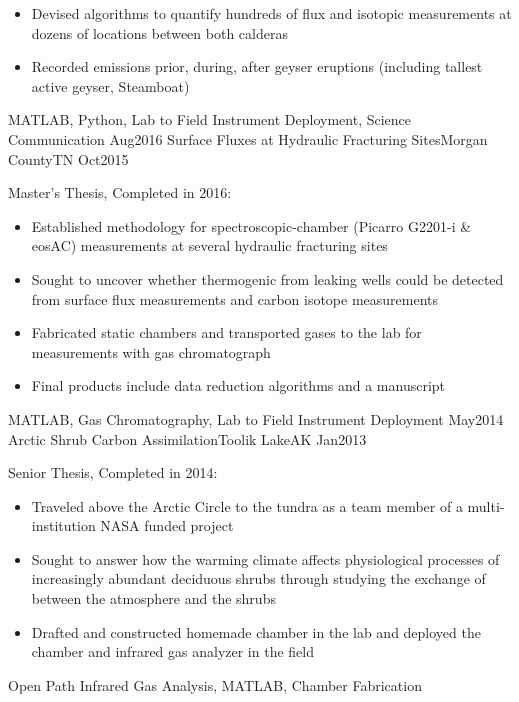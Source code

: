 \begin{experiences}
{\begin{itemize}
                        \item Devised algorithms to quantify hundreds of flux and isotopic measurements at dozens of locations between both calderas
                        \item Recorded emissions prior, during, after geyser eruptions (including tallest active geyser, Steamboat)
                      \end{itemize}
                    }
                    {MATLAB, Python, Lab to Field Instrument Deployment, Science Communication}
  \emptySeparator
  \experience
  {Aug2016}       {Surface Fluxes at Hydraulic Fracturing Sites}{Morgan County}{TN}
  {Oct2015}       {
                   Master's Thesis, Completed in 2016:
                     \begin{itemize}
                        \item Established methodology for spectroscopic-chamber (Picarro G2201-i \& eosAC) measurements at several hydraulic fracturing sites 
                        \item Sought to uncover whether thermogenic  from leaking  wells could be detected from surface flux measurements and carbon isotope measurements
                        \item Fabricated static chambers and transported gases to the lab for measurements with gas chromatograph           
                        \item Final products include data reduction algorithms and a manuscript                      
                      \end{itemize}
                    }
                    {MATLAB, Gas Chromatography, Lab to Field Instrument Deployment}
  \emptySeparator
  \experience
  {May2014}        {Arctic Shrub Carbon Assimilation}{Toolik Lake}{AK}
  {Jan2013}        {
                    Senior Thesis, Completed in 2014:
                    \begin{itemize}
                        \item Traveled above the Arctic Circle to the tundra as a team member of a multi-institution NASA funded project      
                        \item Sought to answer how the warming climate affects physiological processes of increasingly abundant deciduous shrubs through studying the exchange of  between the atmosphere and the shrubs            
                        \item Drafted and constructed homemade chamber in the lab and deployed the chamber and infrared gas analyzer in the field
                      \end{itemize}
                    }
                    {Open Path Infrared Gas Analysis, MATLAB, Chamber Fabrication} 
\end{experiences}

